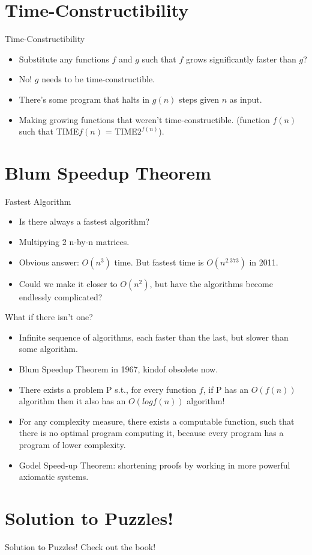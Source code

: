 \documentclass[
    11pt, %
    aspectratio=169, %
]{beamer}
\begin{document}
\section{Time-Constructibility}
\begin{frame}{Time-Constructibility}
    \begin{itemize}
        \item<1-> Substitute any functions $f$ and $g$ such that $f$ grows significantly faster than $g$?
        \item<2-> No! $g$ needs to be time-constructible.
        \item There's some program that halts in $g(n)$ steps given $n$ as input.
        \item Making growing functions that weren't time-constructible. (function $f(n)$ such that TIME$f(n)$ = TIME$2^{f(n)}$).
    \end{itemize}
\end{frame}

\section{Blum Speedup Theorem}
\begin{frame}{Fastest Algorithm}
    \begin{itemize}
        \item Is there always a fastest algorithm?
        \item Multipying 2 n-by-n matrices.
        \item Obvious answer: $O(n^3)$ time. But fastest time is $O(n^{2.373})$ in 2011. 
        \item Could we make it closer to $O(n^2)$, but have the algorithms become endlessly complicated?
    \end{itemize}
\end{frame}

\begin{frame}{What if there isn't one?}
    \begin{itemize}
        \item Infinite sequence of algorithms, each faster than the last, but slower than some algorithm.
        \item Blum Speedup Theorem in 1967, kindof obsolete now.
        \item There exists a problem P s.t., for every function $f$, if P has an $O(f(n))$ algorithm then it also has an $O(log f(n))$ algorithm!
        \item For any complexity measure, there exists a computable function, such that there is no optimal program computing it, because every program has a program of lower complexity. 
        \item Godel Speed-up Theorem: shortening proofs by working in more powerful axiomatic systems. 
    \end{itemize}
\end{frame}

\section{Solution to Puzzles!}
\begin{frame}{Solution to Puzzles!}
\centering
    Check out the book!
\end{frame}
\end{document}
